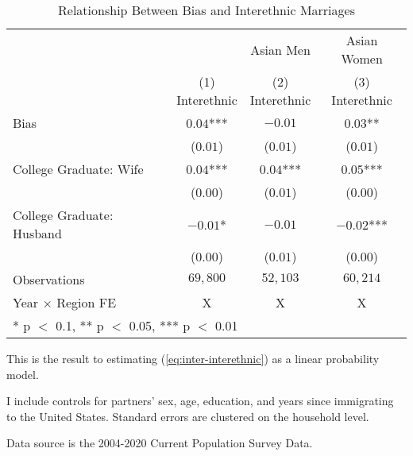 \begin{table}[H]
\centering\centering
\caption{Relationship Between Bias and Interethnic Marriages \label{regtab-logit-02}}
\centering
\begin{threeparttable}
\begin{tabular}[t]{lccc}
\toprule
\multicolumn{2}{c}{ } & \multicolumn{1}{c}{Asian Men} & \multicolumn{1}{c}{Asian Women} \\
\cmidrule(l{3pt}r{3pt}){3-3} \cmidrule(l{3pt}r{3pt}){4-4}
  & \specialcell{(1) \\ Interethnic} & \specialcell{(2) \\ Interethnic} & \specialcell{(3) \\ Interethnic}\\
\midrule
Bias & $0.04$*** & $-0.01$ & $0.03$**\\
 & ($0.01$) & ($0.01$) & ($0.01$)\\
College Graduate: Wife & $0.04$*** & $0.04$*** & $0.05$***\\
 & ($0.00$) & ($0.01$) & \vphantom{1} ($0.00$)\\
College Graduate: Husband & $-0.01$* & $-0.01$ & $-0.02$***\\
 & ($0.00$) & ($0.01$) & ($0.00$)\\
\midrule
Observations & $69,800$ & $52,103$ & $60,214$\\
Year $\times$ Region FE & X & X & X\\
\bottomrule
\multicolumn{4}{l}{\rule{0pt}{1em}* p $<$ 0.1, ** p $<$ 0.05, *** p $<$ 0.01}\\
\end{tabular}
\begin{tablenotes}
\small
\item[1] \footnotesize{This is the result to estimating (\ref{eq:inter-interethnic}) as a
                      linear probability model.}
\item[2] \footnotesize{I include controls for partners' sex, age, education, 
                      and years since immigrating to the United States.
                      Standard errors are clustered on the household level.}
\item[3] \footnotesize{Data source is the 2004-2020 Current Population Survey Data.}
\end{tablenotes}
\end{threeparttable}
\end{table}
